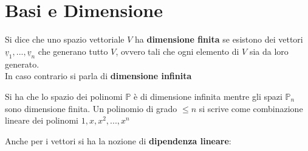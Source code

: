 \documentclass[a4paper,12pt, oneside]{book}
\begin{document}
\section{Basi e Dimensione}
\begin{definizione}
Si dice che uno spazio vettoriale $V$ ha \textbf{dimensione finita} se esistono dei vettori $\underline{v}_1,...,\underline{v}_n$ che generano tutto $V$, ovvero tali che ogni elemento di $V$ sia da loro generato.\\
In caso contrario si parla di \textbf{dimensione infinita}
\end{definizione}
\begin{nota}
Si ha che lo spazio dei polinomi $\mathbb{P}$ è di dimensione infinita mentre gli spazi $\mathbb{P}_n$ sono dimensione finita. Un polinomio di grado $\leq n$ si scrive come combinazione lineare dei polinomi $1,x,x^2,...,x^n$
\end{nota}
Anche per i vettori si ha la nozione di \textbf{dipendenza lineare}:
\end{document}
